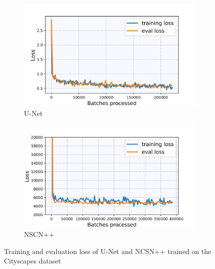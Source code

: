 %
\begin{figure}[] \label{fig:3.2}
    \centering
    \begin{subfigure}[b]{0.49\textwidth}
        \includegraphics[width=\textwidth]{Chapters/figures/experiments/cityscapes/loss_city_seg.jpg}
        \caption{U-Net}
    \end{subfigure}
    \begin{subfigure}[b]{0.49\textwidth}
        \includegraphics[width=\textwidth]{Chapters/figures/experiments/cityscapes/loss_city_ncsn.jpg}
        \caption{NSCN++}
    \end{subfigure}
    \caption[Losses of U-Net/NCSN++ on Cityscapes dataset]{Training and evaluation loss of U-Net and NCSN++ trained on the Cityscapes dataset}
\end{figure}
%
